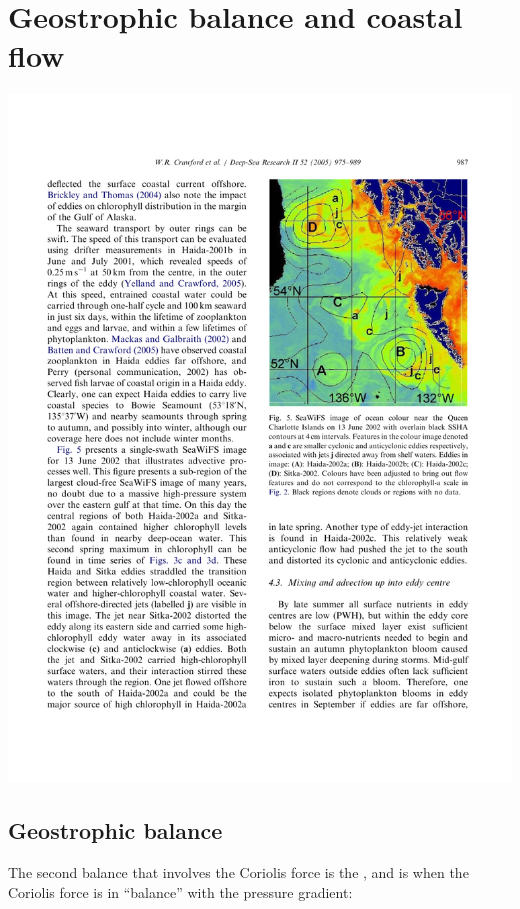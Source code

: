 \chapter{Geostrophic balance and coastal flow}
\label{chap:geostrophic}

\includegraphics[width=6.5in]{figs/Geostrophic/HaidaEddy}

\section{Geostrophic balance}

The second balance that involves the Coriolis force is the , and is when the Coriolis force is in ``balance'' with the pressure gradient:


